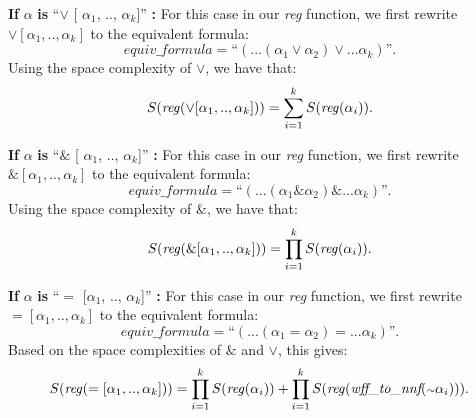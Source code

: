 \documentclass[runningheads]{llncs}
\begin{document}
\textbf{If} $\alpha$ \textbf{is} ``$\lor$ [ $\alpha_{1}$, .., $\alpha_{k}$]'' \textbf{:} 
For this case in our \emph{reg} function, we first rewrite $\lor [\alpha_{1}, .., \alpha_{k}]$ to the equivalent formula:
    \[ 
    \textit{equiv\_formula} = \text{``}( ... (\alpha_{1} \lor \alpha_{2}) \lor ... \alpha_{k})\text{''}.
    \]
Using the space complexity of $\lor$, we have that:
    \[
    S(\text{\emph{reg}}(\lor [\alpha_{1}, .., \alpha_{k}])) = 
    \sum_{i=1}^{k} S(\text{\emph{reg}}(\alpha_{i})).
    \]

\textbf{If} $\alpha$ \textbf{is} ``$\&$ [ $\alpha_{1}$, .., $\alpha_{k}$]'' \textbf{:} 
For this case in our \emph{reg} function, we first rewrite $\& [\alpha_{1}, .., \alpha_{k}]$ to the equivalent formula:
    \[ 
    \textit{equiv\_formula} = \text{``}( ... (\alpha_{1} \& \alpha_{2}) \& ... \alpha_{k})\text{''}.
    \]
Using the space complexity of $\&$, we have that:
    \[
    S(\text{\emph{reg}}(\& [\alpha_{1}, .., \alpha_{k}])) = 
    \prod_{i=1}^{k} S(\text{\emph{reg}}(\alpha_{i})).
    \]

\textbf{If} $\alpha$ \textbf{is} ``$=$ [$\alpha_{1}$, .., $\alpha_{k}$]'' \textbf{:}
For this case in our \emph{reg} function, we first rewrite $= [\alpha_{1}, .., \alpha_{k}]$ to the equivalent formula:
    \[ 
    \textit{equiv\_formula} = \text{``}( ... (\alpha_{1} = \alpha_{2}) = ... \alpha_{k})\text{''}.
    \]
Based on the space complexities of $\&$ and $\lor$, this gives:
    \[
    S(\text{\emph{reg}}(= [\alpha_{1}, .., \alpha_{k}])) = 
    \prod_{i=1}^{k} S(\text{\emph{reg}}(\alpha_{i}))
    + \prod_{i=1}^{k} S(\text{\emph{reg}}(\textit{wff\_to\_nnf}(\scriptstyle{\sim}\textstyle \alpha_{i}))).
    \]
\end{document}
